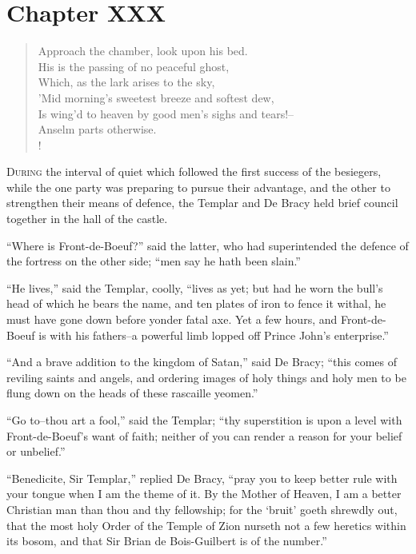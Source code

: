 \chapter{Chapter XXX}

\begin{verse}
Approach the chamber, look upon his bed.\\
His is the passing of no peaceful ghost,\\
Which, as the lark arises to the sky,\\
'Mid morning's sweetest breeze and softest dew,\\
Is wing'd to heaven by good men's sighs and tears!--\\
Anselm parts otherwise.\\!
\end{verse}

\lettrine{D}{uring} the interval of quiet which followed the first
success of the
besiegers, while the one party was preparing to pursue their advantage,
and the other to strengthen their means of defence, the Templar and De
Bracy held brief council together in the hall of the castle.

``Where is Front-de-Boeuf?'' said the latter, who had superintended the
defence of the fortress on the other side; ``men say he hath been
slain.''

``He lives,'' said the Templar, coolly, ``lives as yet; but had he worn
the bull's head of which he bears the name, and ten plates of iron to
fence it withal, he must have gone down before yonder fatal axe. Yet a
few hours, and Front-de-Boeuf is with his fathers--a powerful limb
lopped off Prince John's enterprise.''

``And a brave addition to the kingdom of Satan,'' said De Bracy; ``this
comes of reviling saints and angels, and ordering images of holy things
and holy men to be flung down on the heads of these rascaille yeomen.''

``Go to--thou art a fool,'' said the Templar; ``thy superstition is upon
a level with Front-de-Boeuf's want of faith; neither of you can render a
reason for your belief or unbelief.''

``Benedicite, Sir Templar,'' replied De Bracy, ``pray you to keep better
rule with your tongue when I am the theme of it. By the Mother of
Heaven, I am a better Christian man than thou and thy fellowship; for
the `bruit' goeth shrewdly out, that the most holy Order of the Temple
of Zion nurseth not a few heretics within its bosom, and that Sir Brian
de Bois-Guilbert is of the number.''

